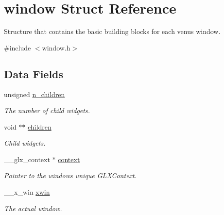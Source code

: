\hypertarget{structwindow}{}\section{window Struct Reference}
\label{structwindow}


Structure that contains the basic building blocks for each venus window.  




{\ttfamily \#include $<$window.\+h$>$}

\subsection*{Data Fields}
\begin{DoxyCompactItemize}
\item 
\mbox{\label{structwindow_a9dcdf1cf06c0e60a6c897d1dad4e1db6}} 
unsigned \hyperlink{structwindow_a9dcdf1cf06c0e60a6c897d1dad4e1db6}{n\+\_\+children}
\begin{DoxyCompactList}\small\item\em The number of child widgets. \end{DoxyCompactList}\item 
\mbox{\label{structwindow_a2eb202df09af540b9848de2661eec826}} 
void $\ast$$\ast$ \hyperlink{structwindow_a2eb202df09af540b9848de2661eec826}{children}
\begin{DoxyCompactList}\small\item\em Child widgets. \end{DoxyCompactList}\item 
\mbox{\label{structwindow_a90eff798620fee3c37913a2a50f1c2a8}} 
\+\_\+\+\_\+glx\+\_\+context $\ast$ \hyperlink{structwindow_a90eff798620fee3c37913a2a50f1c2a8}{context}
\begin{DoxyCompactList}\small\item\em Pointer to the window\textquotesingle{}s unique G\+L\+X\+Context. \end{DoxyCompactList}\item 
\mbox{\label{structwindow_a23ff6e8e3c92fbe719eac958c837303d}} 
\+\_\+\+\_\+x\+\_\+win \hyperlink{structwindow_a23ff6e8e3c92fbe719eac958c837303d}{xwin}
\begin{DoxyCompactList}\small\item\em The actual window. \end{DoxyCompactList}\end{DoxyCompactItemize}


